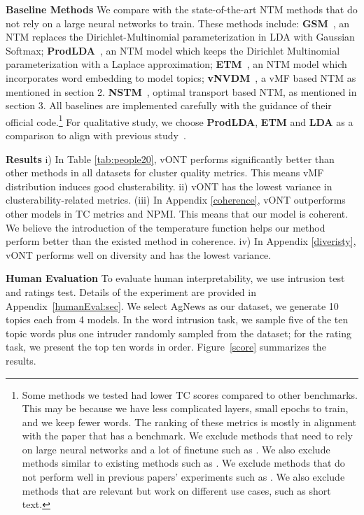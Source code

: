 \documentclass[11pt]{article}
\begin{document}
\textbf{Baseline Methods}
We compare with the state-of-the-art NTM methods that do not rely on a large neural networks to train. These methods include: \textbf{GSM}~\cite{miao2018discovering}, an NTM replaces the Dirichlet-Multinomial parameterization in LDA with Gaussian Softmax; \textbf{ProdLDA}~\cite{srivastava2017autoencoding}, an NTM model which keeps the Dirichlet Multinomial parameterization with a Laplace approximation; \textbf{ETM}~\cite{dieng2020topic}, an NTM model which incorporates word embedding to model topics; \textbf{vNVDM}~\cite{xu2018spherical}, a vMF based NTM as mentioned in section 2. \textbf{NSTM}~\cite{zhao2020neural}, optimal transport based NTM, as mentioned in section 3. All baselines are implemented carefully with the guidance of their official code.\footnote{Some methods we tested had lower TC scores compared to other benchmarks. This may be because we have less complicated layers, small epochs to train, and we keep fewer words. The ranking of these metrics is mostly in alignment with the paper that has a benchmark. We exclude methods that need to rely on large neural networks and a lot of finetune such as \cite{duan2021sawtooth,duan2021topicnet}. We also exclude methods similar to existing methods such as \cite{Wang2022RepresentingMO}. We exclude methods that do not perform well in previous papers' experiments \cite{duan2021sawtooth} such as \cite{JMLR:v20:18-569}. We also exclude methods that are relevant but work on different use cases, such as short text.\cite{wu-etal-2020-short}} 
For qualitative study, we choose \textbf{ProdLDA}, \textbf{ETM} and \textbf{LDA} as a comparison to align with previous study~\cite{hoyle2021automated}.


\textbf{Results} i) In Table \ref{tab:people20}, vONT performs significantly better than other methods in all datasets for cluster quality metrics. This means vMF distribution induces good clusterability.   ii) vONT has the lowest variance in clusterability-related metrics. (iii) In Appendix \ref{coherence}, vONT outperforms other models in TC metrics  and NPMI. This means that our model is coherent. We believe the introduction of the temperature function helps our method perform better than the existed method in coherence. iv) In Appendix \ref{diveristy}, vONT performs well on diversity and has the lowest variance.

\textbf{Human Evaluation} To evaluate human interpretability, we use intrusion test and ratings test. Details of the experiment are provided in Appendix~\ref{humanEval:sec}. We select AgNews as our dataset, we generate 10 topics each from 4 models. In the word intrusion task, we sample five of the ten topic words plus one intruder randomly sampled from the dataset; for the rating task, we present the top ten words in order. Figure~\ref{score} summarizes the results.
\end{document}
